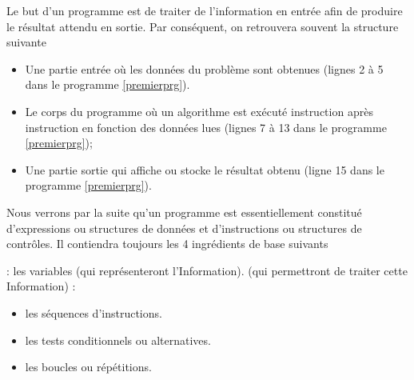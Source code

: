 \documentclass[11pt, a4paper]{book}
\begin{document}
\begin{eclairage}
	Le but d'un programme est de traiter de l'information en entrée afin de produire le résultat attendu en sortie. Par conséquent, on retrouvera souvent la structure suivante
	\begin{itemize}
		\item Une partie entrée où les données du problème sont obtenues (lignes 2 à 5 dans le programme \ref{premierprg}).
		\item Le corps du programme où un algorithme est exécuté instruction après instruction en fonction des données lues (lignes 7 à 13 dans le programme \ref{premierprg});
		\item Une partie sortie qui affiche ou stocke le résultat obtenu (ligne 15 dans le programme \ref{premierprg}).
	\end{itemize}
	Nous verrons par la suite qu'un programme est essentiellement constitué d’expressions ou structures de données et d’instructions ou structures de contrôles. Il contiendra toujours les 4 ingrédients de base suivants
	\begin{itemize}
		 : les variables (qui représenteront l’Information).
		 (qui permettront de traiter cette Information) :
		\begin{itemize}
			\item les séquences d’instructions.
			\item les tests conditionnels ou alternatives.
			\item les boucles ou répétitions.
		\end{itemize}
	\end{itemize}
\end{eclairage}
\end{document}
